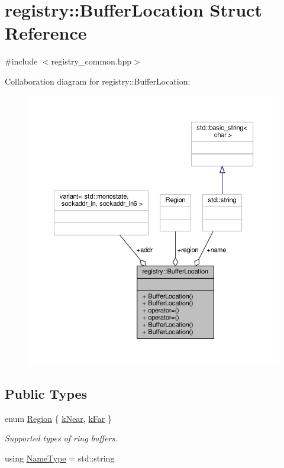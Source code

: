 \hypertarget{structregistry_1_1BufferLocation}{}\section{registry\+:\+:Buffer\+Location Struct Reference}
\label{structregistry_1_1BufferLocation}


{\ttfamily \#include $<$registry\+\_\+common.\+hpp$>$}



Collaboration diagram for registry\+:\+:Buffer\+Location\+:\nopagebreak
\begin{figure}[H]
\begin{center}
\leavevmode
\includegraphics[width=350pt]{structregistry_1_1BufferLocation__coll__graph}
\end{center}
\end{figure}
\subsection*{Public Types}
\begin{DoxyCompactItemize}
\item 
enum \hyperlink{structregistry_1_1BufferLocation_a07b156ecd0690dbebb5cba36d4d23ba0}{Region} \{ \hyperlink{structregistry_1_1BufferLocation_a07b156ecd0690dbebb5cba36d4d23ba0aabe46bdcd661a69bbcbc5963274eee79}{k\+Near}, 
\hyperlink{structregistry_1_1BufferLocation_a07b156ecd0690dbebb5cba36d4d23ba0a7ff68b6384eccdda3bc530b02228102d}{k\+Far}
 \}\begin{DoxyCompactList}\small\item\em Supported types of ring buffers. \end{DoxyCompactList}
\item 
using \hyperlink{structregistry_1_1BufferLocation_ad3c2279012b74798fa1e348507020fa4}{Name\+Type} = std\+::string
\end{DoxyCompactItemize}
